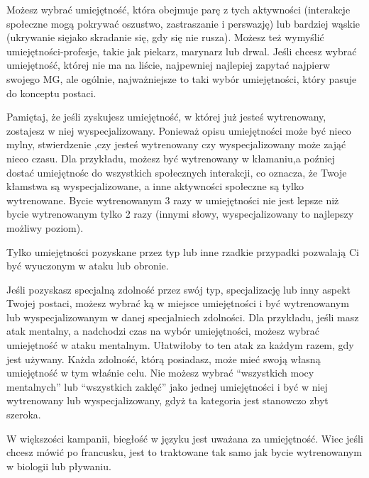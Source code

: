 Możesz wybrać umiejętność, która obejmuje parę z tych aktywności (interakcje społeczne mogą pokrywać oszustwo, zastraszanie i perswazję) lub bardziej wąskie (ukrywanie sięjako skradanie się, gdy się nie rusza). Możesz też wymyślić umiejętności-profesje, takie jak piekarz, marynarz lub drwal. Jeśli chcesz wybrać umiejętność, której nie ma na liście, najpewniej najlepiej zapytać najpierw swojego MG, ale ogólnie, najważniejsze to taki wybór umiejętności, który pasuje do konceptu postaci.

Pamiętaj, że jeśli zyskujesz umiejętność, w której już jesteś wytrenowany, zostajesz w niej wyspecjalizowany. Ponieważ opisu umiejętności może być nieco mylny, stwierdzenie ,czy jesteś wytrenowany czy wyspecjalizowany może zająć nieco czasu. Dla przykładu, możesz być wytrenowany w kłamaniu,a poźniej dostać umiejętnośc do wszystkich społecznych interakcji, co oznacza, że Twoje kłamstwa są wyspecjalizowane, a inne aktywności społeczne są tylko wytrenowane. Bycie wytrenowanym 3 razy w umiejętności nie jest lepsze niż bycie wytrenowanym tylko 2 razy (innymi słowy, wyspecjalizowany to najlepszy możliwy poziom).

Tylko umiejętności pozyskane przez typ lub inne rzadkie przypadki pozwalają Ci być wyuczonym w ataku lub obronie.

Jeśli pozyskasz specjalną zdolność przez swój typ, specjalizację lub inny aspekt Twojej postaci, możesz wybrać ką w miejsce umiejętności i być wytrenowanym lub wyspecjalizowanym w danej specjalniech zdolności. Dla przykładu, jeśli masz atak mentalny, a nadchodzi czas na wybór umiejętności, możesz wybrać umiejętność w ataku mentalnym. Ułatwiłoby to ten atak za każdym razem, gdy jest używany. Każda zdolność, którą posiadasz, może mieć swoją własną umiejętność w tym właśnie celu. Nie możesz wybrać “wszystkich mocy mentalnych” lub “wszystkich zaklęć” jako jednej umiejętności i być w niej wytrenowany lub wyspecjalizowany, gdyż ta kategoria jest stanowczo zbyt szeroka.

W większości kampanii, biegłość w języku jest uważana za umiejętność. Wiec jeśli chcesz mówić po francusku, jest to traktowane tak samo jak bycie wytrenowanym w biologii lub pływaniu.